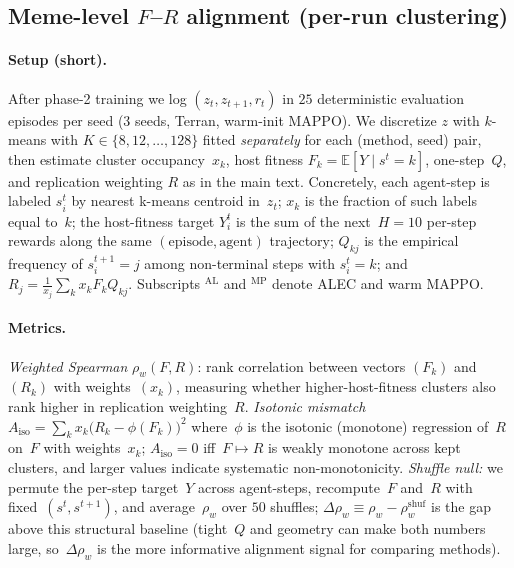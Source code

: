 
\subsection{Meme-level $F$--$R$ alignment (per-run clustering)}
\label{sec:rale-per-seed}

\paragraph{Setup (short).}
After phase-2 training we log $(z_t,z_{t+1},r_t)$ in $25$ deterministic evaluation episodes per seed (3 seeds, Terran, warm-init MAPPO).
We discretize $z$ with $k$-means with $K\in\{8,12,\dots,128\}$ fitted \emph{separately} for each (method, seed) pair, then estimate cluster occupancy~$x_k$, host fitness $F_k=\mathbb{E}[Y\mid s^t{=}k]$, one-step~$Q$, and replication weighting $R$ as in the main text.
Concretely, each agent-step is labeled $s_i^t$ by nearest k-means centroid in~$z_t$; $x_k$ is the fraction of such labels equal to~$k$; the host-fitness target $Y_i^t$ is the sum of the next~$H{=}10$ per-step rewards along the same $(\text{episode},\text{agent})$ trajectory; $Q_{kj}$ is the empirical frequency of $s_i^{t+1}{=}j$ among non-terminal steps with $s_i^t{=}k$; and $R_j{=}\frac{1}{x_j}\sum_k x_k F_k Q_{kj}$.
Subscripts $^{\mathrm{AL}}$ and $^{\mathrm{MP}}$ denote ALEC and warm MAPPO.

\paragraph{Metrics.}
\emph{Weighted Spearman} $\rho_w(F,R)$: rank correlation between vectors $(F_k)$ and $(R_k)$ with weights~$(x_k)$, measuring whether higher-host-fitness clusters also rank higher in replication weighting~$R$.
\emph{Isotonic mismatch} $A_{\mathrm{iso}}=\sum_k x_k\bigl(R_k-\phi(F_k)\bigr)^2$ where~$\phi$ is the isotonic (monotone) regression of~$R$ on~$F$ with weights~$x_k$; $A_{\mathrm{iso}}=0$ iff~$F\mapsto R$ is weakly monotone across kept clusters, and larger values indicate systematic non-monotonicity.
\emph{Shuffle null:} we permute the per-step target~$Y$ across agent-steps, recompute~$F$ and~$R$ with fixed~$(s^t,s^{t+1})$, and average~$\rho_w$ over $50$ shuffles; $\Delta\rho_w\equiv \rho_w-\rho_w^{\mathrm{shuf}}$ is the gap above this structural baseline (tight~$Q$ and geometry can make both numbers large, so~$\Delta\rho_w$ is the more informative alignment signal for comparing methods).

